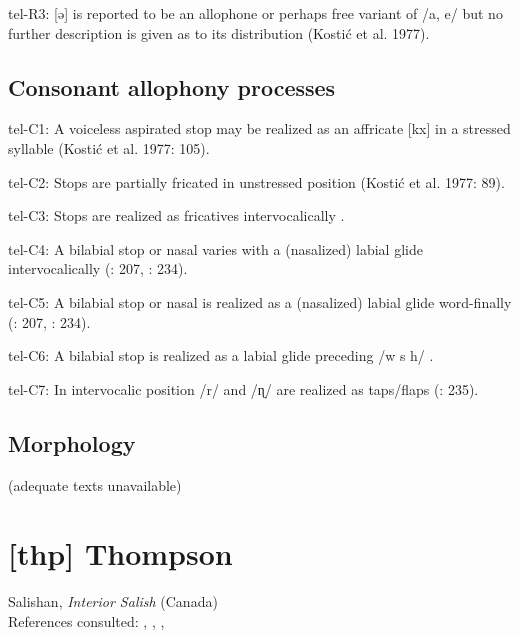 {\begin{appendixdesc}
\item[tel-R3:] [ə] is reported to be an allophone or perhaps free variant of /a, e/ but no further description is given as to its distribution (Kostić et al. 1977).
\end{appendixdesc}
\subsection*{Consonant allophony processes}
\begin{appendixdesc}

\item[tel-C1:] A voiceless aspirated stop may be realized as an affricate [kx] in a stressed syllable (Kostić et al. 1977: 105).

\item[tel-C2:] Stops are partially fricated in unstressed position (Kostić et al. 1977: 89).

\item[tel-C3:] Stops are realized as fricatives intervocalically \citep[207]{Krishnamurti1998}.

\item[tel-C4:] A bilabial stop or nasal varies with a (nasalized) labial glide intervocalically (\citealt{Krishnamurti1998}: 207, \citealt{BhaskararaoRay2017}: 234).

\item[tel-C5:] A bilabial stop or nasal is realized as a (nasalized) labial glide word-finally (\citealt{Krishnamurti1998}: 207, \citealt{BhaskararaoRay2017}: 234).

\item[tel-C6:] A bilabial stop is realized as a labial glide preceding /w s h/ \citep[207]{Krishnamurti1998}.

\item[tel-C7:] In intervocalic position /r/ and /ɳ/ are realized as taps/flaps (\citealt{BhaskararaoRay2017}: 235).
\end{appendixdesc}
\subsection*{Morphology}

(adequate texts unavailable)

\section*{[thp] Thompson}  %
Salishan, \textit{Interior Salish} (Canada)\medskip\\
References consulted: \citet{Koch2008}, \citet{ThompsonThompson1992}, \citet{ThompsonThompson1996}, \citet{ThompsonEtAl1996}

}
